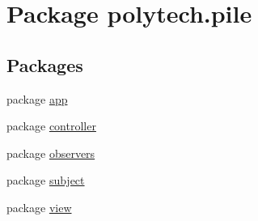 \hypertarget{namespacepolytech_1_1pile}{}\section{Package polytech.\+pile}
\label{namespacepolytech_1_1pile}
\subsection*{Packages}
\begin{DoxyCompactItemize}
\item 
package \hyperlink{namespacepolytech_1_1pile_1_1app}{app}
\item 
package \hyperlink{namespacepolytech_1_1pile_1_1controller}{controller}
\item 
package \hyperlink{namespacepolytech_1_1pile_1_1observers}{observers}
\item 
package \hyperlink{namespacepolytech_1_1pile_1_1subject}{subject}
\item 
package \hyperlink{namespacepolytech_1_1pile_1_1view}{view}
\end{DoxyCompactItemize}
